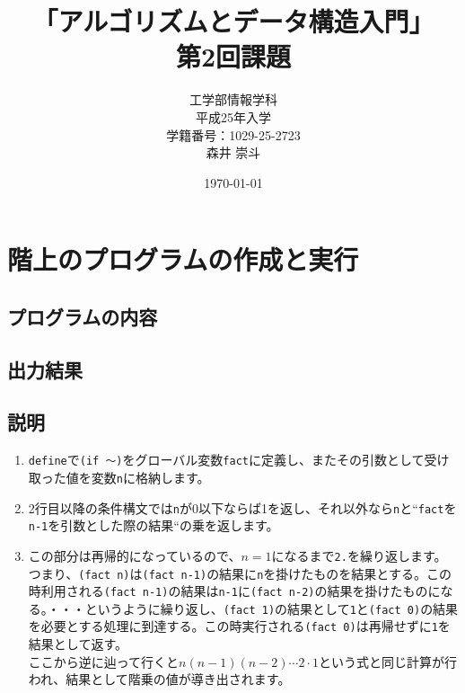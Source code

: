 \documentclass[a4paper,12pt]{article}
\begin{document}
\title{「アルゴリズムとデータ構造入門」\\
第2回課題}
\author{工学部情報学科\\
平成25年入学\\
学籍番号：1029-25-2723\\
森井 崇斗 }
\date{\today}
\maketitle

\lstset{numbers=left,basicstyle=\ttfamily\small,
  commentstyle=\textit, keywordstyle=\bfseries}

  \section{階上のプログラムの作成と実行}
  \subsection{プログラムの内容}



\subsection{出力結果}


\subsection{説明}
\begin{enumerate}
    \item {\tt define}で{\tt (if 〜)}をグローバル変数{\tt fact}に定義し、またその引数として受け取った値を変数{\tt n}に格納します。
    \item 2行目以降の条件構文では{\tt n}が0以下ならば1を返し、それ以外なら{\tt n}と``{\tt fact}を{\tt n-1}を引数とした際の結果``の乗を返します。
    \item この部分は再帰的になっているので、$n=1$になるまで{\tt 2.}を繰り返します。\\
        つまり、{\tt (fact n)}は{\tt (fact n-1)}の結果に{\tt n}を掛けたものを結果とする。この時利用される{\tt (fact n-1)}の結果は{\tt n-1}に{\tt (fact n-2)}の結果を掛けたものになる。・・・というように繰り返し、{\tt (fact 1)}の結果として{\tt 1}と{\tt (fact 0)}の結果を必要とする処理に到達する。この時実行される{\tt (fact 0)}は再帰せずに{\tt 1}を結果として返す。\\
        ここから逆に辿って行くと$n(n-1)(n-2) \cdots 2\cdot1$という式と同じ計算が行われ、結果として階乗の値が導き出されます。
\end{enumerate}
\end{document}
